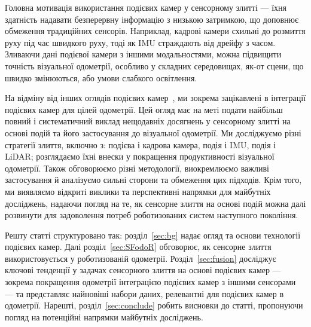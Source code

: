 \begin{table}[t]
\centering
\caption{Виробники подієвих камер.}
\label{tab:even-manufactures}
\end{table}

Головна мотивація використання подієвих камер у сенсорному злитті — їхня здатність надавати безперервну інформацію з низькою затримкою, що доповнює обмеження традиційних сенсорів. Наприклад, кадрові камери схильні до розмиття руху під час швидкого руху, тоді як IMU страждають від дрейфу з часом. Зливаючи дані подієвої камери з іншими модальностями, можна підвищити точність візуальної одометрії, особливо у складних середовищах, як-от сцени, що швидко змінюються, або умови слабкого освітлення.

На відміну від інших оглядів подієвих камер~\cite{gallego2020event, shariff2024event, jia2022event, iddrisu2024event, chakravarthi2024recent}, ми зокрема зацікавлені в інтеграції подієвих камер для цілей одометрії. Цей огляд має на меті подати найбільш повний і систематичний виклад нещодавніх досягнень у сенсорному злитті на основі подій та його застосування до візуальної одометрії. Ми досліджуємо різні стратегії злиття, включно з: подієва і кадрова камера, подія і IMU, подія і LiDAR; розглядаємо їхні внески у покращення продуктивності візуальної одометрії. Також обговорюємо різні методології, виокремлюємо важливі застосування й аналізуємо сильні сторони та обмеження цих підходів. Крім того, ми виявляємо відкриті виклики та перспективні напрямки для майбутніх досліджень, надаючи погляд на те, як сенсорне злиття на основі подій можна далі розвинути для задоволення потреб роботизованих систем наступного покоління.

Решту статті структуровано так: розділ~\ref{sec:bg} надає огляд та основи технології подієвих камер. Далі розділ~\ref{sec:SFodoR} обговорює, як сенсорне злиття використовується у роботизованій одометрії. Розділ~\ref{sec:fusion} досліджує ключові тенденції у задачах сенсорного злиття на основі подієвих камер — зокрема покращення одометрії інтеграцією подієвих камер з іншими сенсорами — та представляє найновіші набори даних, релевантні для подієвих камер в одометрії. Нарешті, розділ~\ref{sec:conclude} робить висновки до статті, пропонуючи погляд на потенційні напрямки майбутніх досліджень.
